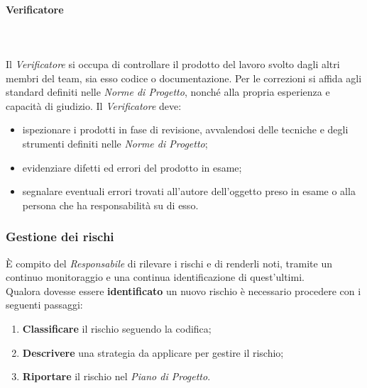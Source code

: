 \paragraph{Verificatore}\mbox{} \\ \mbox{} \\
Il \textit{Verificatore} si occupa di controllare il prodotto del lavoro svolto dagli altri membri del team, sia esso codice o documentazione. Per le correzioni si affida agli standard definiti nelle \textit{Norme di Progetto}, nonché alla propria esperienza e capacità di giudizio.
Il \textit{Verificatore} deve:
\begin{itemize}
	\item ispezionare i prodotti in fase di revisione, avvalendosi delle tecniche e degli strumenti definiti nelle \textit{Norme di Progetto};
	\item evidenziare difetti ed errori del prodotto in esame;
	\item segnalare eventuali errori trovati all'autore dell'oggetto preso in esame o alla persona che ha responsabilità su di esso.
\end{itemize}

\subsubsection{Gestione dei rischi}
È compito del \textit{Responsabile} di rilevare i rischi e di renderli noti, tramite un continuo monitoraggio e una continua identificazione di quest'ultimi. \\
Qualora dovesse essere \textbf{identificato} un nuovo rischio è necessario procedere con i seguenti passaggi:
\begin{enumerate}
	\item \textbf{Classificare} il rischio seguendo la codifica;
	\item \textbf{Descrivere} una strategia da applicare per gestire il rischio;
	\item \textbf{Riportare} il rischio nel \textit{Piano di Progetto}.
\end{enumerate}


